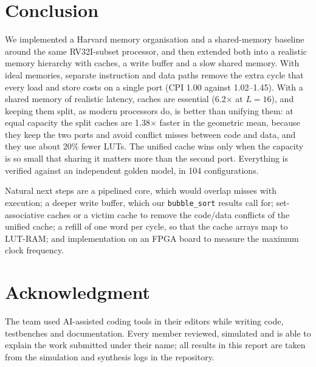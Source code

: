 \documentclass[conference]{IEEEtran}
\begin{document}
\section{Conclusion}
\label{sec:concl}
We implemented a Harvard memory organisation and a shared-memory baseline
around the same RV32I-subset processor, and then extended both into a
realistic memory hierarchy with caches, a write buffer and a slow shared
memory. With ideal memories, separate instruction and data paths remove the
extra cycle that every load and store costs on a single port (CPI 1.00
against 1.02--1.45). With a shared memory of realistic latency, caches are
essential (6.2$\times$ at $L=16$), and keeping them split, as modern
processors do, is better than unifying them: at equal capacity the split
caches are 1.38$\times$ faster in the geometric mean, because they keep the
two ports and avoid conflict misses between code and data, and they use
about 20\% fewer LUTs. The unified cache wins only when the capacity is so
small that sharing it matters more than the second port. Everything is
verified against an independent golden model, in 104 configurations.

Natural next steps are a pipelined core, which would overlap misses with
execution; a deeper write buffer, which our \texttt{bubble\_sort} results
call for; set-associative caches or a victim cache to remove the code/data
conflicts of the unified cache; a refill of one word per cycle, so that the
cache arrays map to LUT-RAM; and implementation on an FPGA board to measure
the maximum clock frequency.

\section*{Acknowledgment}
The team used AI-assisted coding tools in their editors while writing code,
testbenches and documentation. Every member reviewed, simulated and is able to
explain the work submitted under their name; all results in this report are
taken from the simulation and synthesis logs in the repository.



\end{document}
